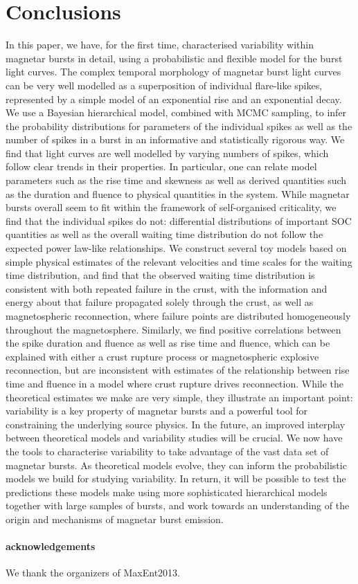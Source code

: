 \documentclass[12pt]{emulateapj}
\begin{document}
\section{Conclusions}

In this paper, we have, for the first time, characterised variability within magnetar bursts in detail, using a probabilistic and flexible model for the burst light curves.
The complex temporal morphology of magnetar burst light curves can be very well modelled as a superposition of individual flare-like spikes, represented by a simple
model of an exponential rise and an exponential decay. We use a Bayesian hierarchical model, combined with MCMC sampling, to infer the probability distributions for
parameters of the individual spikes as well as the number of spikes in a burst in an informative and statistically rigorous way. 
We find that light curves are well modelled by varying numbers of spikes, which follow clear trends in their properties. In particular, one can relate model parameters such as the 
rise time and skewness as well as derived quantities such as the duration and fluence to physical quantities in the system. 
While magnetar bursts overall seem to fit within the framework of self-organised criticality, we find that the individual spikes do not: differential distributions of important SOC 
quantities as well as the overall waiting time distribution do not follow the expected power law-like relationships.
We construct several toy models based on simple physical estimates of the relevant velocities and time scales for the waiting time distribution, and find that the observed waiting time distribution is 
consistent with both repeated failure in the crust, with the information and energy about that failure propagated solely through the crust, as well as magnetospheric reconnection, where
failure points are distributed homogeneously throughout the magnetosphere. Similarly, we find positive correlations between the spike duration and fluence as well as rise time and fluence, 
which can be explained with either a crust rupture process or magnetospheric explosive reconnection, but are inconsistent with estimates of the relationship between rise time and fluence in a model where
crust rupture drives reconnection. 
While the theoretical estimates we make are very simple, they illustrate an important point: variability is a key property of magnetar bursts and a powerful tool for constraining the
underlying source physics. In the future, an improved interplay between theoretical models and variability studies will be crucial. We now have the tools to characterise variability to take advantage of 
the vast data set of magnetar bursts. As theoretical 
models evolve, they can inform the probabilistic models we build for studying variability. In return, it will be possible to test the predictions these models make using more sophisticated hierarchical models together with large samples of bursts,  and work towards an understanding of the origin and mechanisms of magnetar burst emission.


\paragraph{acknowledgements}
We thank the organizers of MaxEnt2013.
\clearpage



\end{document}
